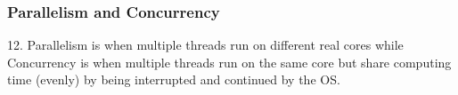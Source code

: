 \documentclass[12pt, a4paper]{article}
\begin{document}
\subsubsection*{Parallelism and Concurrency}
12. Parallelism is when multiple threads run on different real cores while Concurrency is when multiple threads run on the same core but share computing time (evenly) by being interrupted and continued by the OS.
\end{document}

